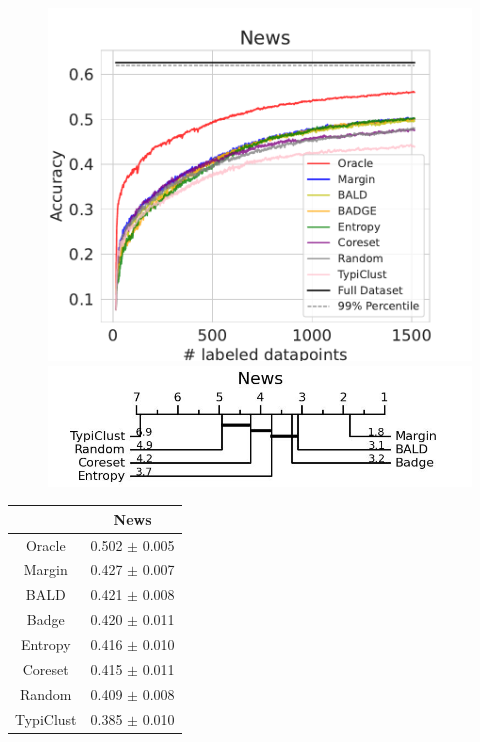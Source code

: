 \documentclass[]{article}
\begin{document}
\begin{minipage}{0.65\linewidth}
\begin{figure}[H]
    \centering
\includegraphics[width=\linewidth]{img/eval_news} \\[2mm]
\includegraphics[width=\linewidth]{img/micro_news.jpg}
\end{figure}
\end{minipage}
\begin{minipage}{0.29\linewidth}
\begin{tabular}{c|c}
&News\\
\hline
Oracle&0.502 $\pm$ 0.005\\
Margin&0.427 $\pm$ 0.007\\
BALD&0.421 $\pm$ 0.008\\
Badge&0.420 $\pm$ 0.011\\
Entropy&0.416 $\pm$ 0.010\\
Coreset&0.415 $\pm$ 0.011\\
Random&0.409 $\pm$ 0.008\\
TypiClust&0.385 $\pm$ 0.010\\
\end{tabular}
\end{minipage}
\end{document}
